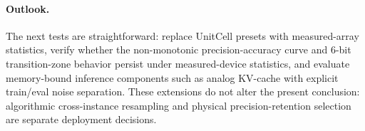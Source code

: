 \paragraph{Outlook.} The next tests are straightforward: replace UnitCell presets with measured-array statistics, verify whether the non-monotonic precision-accuracy curve and 6-bit transition-zone behavior persist under measured-device statistics, and evaluate memory-bound inference components such as analog KV-cache with explicit train/eval noise separation. These extensions do not alter the present conclusion: algorithmic cross-instance resampling and physical precision-retention selection are separate deployment decisions.
